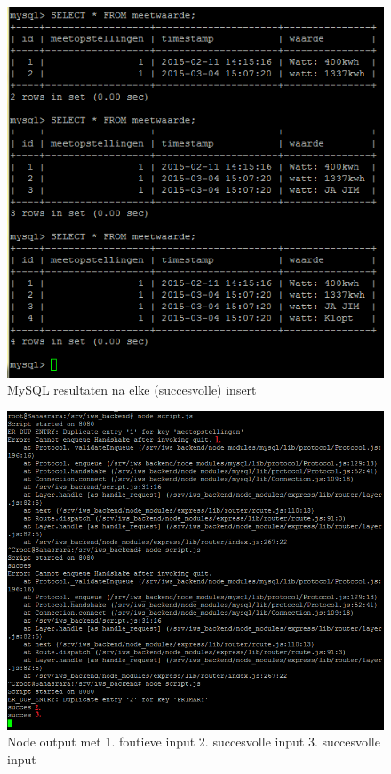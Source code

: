 \documentclass[12pt]{article}
\begin{document}
\begin{figure}
\begin{center}
\includegraphics[scale=1]{Rest_test_1.png}
\caption{MySQL resultaten na elke (succesvolle) insert}
\label{fig:rest_test1}
\end{center}
\end{figure}
\begin{figure}
\begin{center}
\includegraphics[scale=.9]{Rest_test_2.PNG}
\caption{Node output met 1. foutieve input 2. succesvolle input 3. succesvolle input}
\label{fig:rest_test2}
\end{center}
\end{figure}
\end{document}
